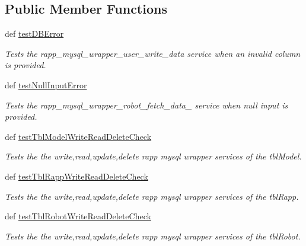 \subsection*{Public Member Functions}
\begin{DoxyCompactItemize}
\item 
def \hyperlink{classrapp__mysql__wrapper__functional__tests_1_1TestDbWrapper_af6bf66a9f4b4920c64165459818b7f71}{test\-D\-B\-Error}
\begin{DoxyCompactList}\small\item\em Tests the rapp\-\_\-mysql\-\_\-wrapper\-\_\-user\-\_\-write\-\_\-data service when an invalid column is provided. \end{DoxyCompactList}\item 
def \hyperlink{classrapp__mysql__wrapper__functional__tests_1_1TestDbWrapper_a3dff10f20c952af62972081d76f9a9b4}{test\-Null\-Input\-Error}
\begin{DoxyCompactList}\small\item\em Tests the rapp\-\_\-mysql\-\_\-wrapper\-\_\-robot\-\_\-fetch\-\_\-data\-\_\- service when null input is provided. \end{DoxyCompactList}\item 
def \hyperlink{classrapp__mysql__wrapper__functional__tests_1_1TestDbWrapper_ac91ff51d86f41616e45cfc95c2f5d930}{test\-Tbl\-Model\-Write\-Read\-Delete\-Check}
\begin{DoxyCompactList}\small\item\em Tests the the write,read,update,delete rapp mysql wrapper services of the tbl\-Model. \end{DoxyCompactList}\item 
def \hyperlink{classrapp__mysql__wrapper__functional__tests_1_1TestDbWrapper_a3fbf29ed5eaadbd3bcf0eb21c668150a}{test\-Tbl\-Rapp\-Write\-Read\-Delete\-Check}
\begin{DoxyCompactList}\small\item\em Tests the the write,read,update,delete rapp mysql wrapper services of the tbl\-Rapp. \end{DoxyCompactList}\item 
def \hyperlink{classrapp__mysql__wrapper__functional__tests_1_1TestDbWrapper_ac4c6857c6c24cb2c0fc4464be012b029}{test\-Tbl\-Robot\-Write\-Read\-Delete\-Check}
\begin{DoxyCompactList}\small\item\em Tests the the write,read,update,delete rapp mysql wrapper services of the tbl\-Robot. \end{DoxyCompactList}\item 

\end{DoxyCompactItemize}
